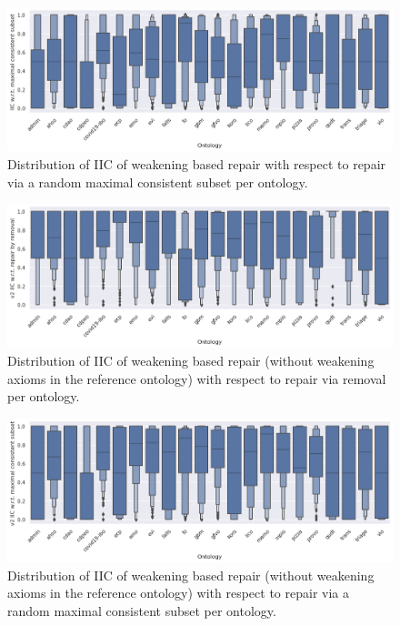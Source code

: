 \begin{figure}[htbp]
  \centering
  \includegraphics[width=\textwidth]{resources/iic-mcs-ontology-violin.png}
  \caption{Distribution of IIC of weakening based repair with respect to repair via a random maximal consistent subset per ontology.}
\end{figure}

\begin{figure}[htbp]
  \centering
  \includegraphics[width=\textwidth]{resources/iic-enhance-rem-ontology-violin.png}
  \caption{Distribution of IIC of weakening based repair (without weakening axioms in the reference ontology) with respect to repair via removal per ontology.}
\end{figure}

\begin{figure}[htbp]
  \centering
  \includegraphics[width=\textwidth]{resources/iic-enhance-ontology-violin.png}
  \caption{Distribution of IIC of weakening based repair (without weakening axioms in the reference ontology) with respect to repair via a random maximal consistent subset per ontology.}
\end{figure}

